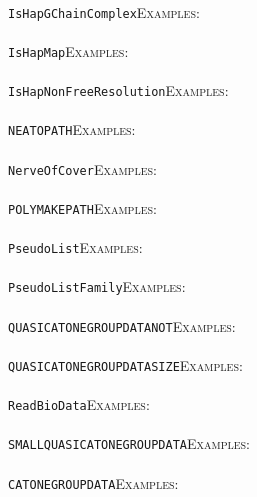 \documentclass[a4paper,11pt]{report}
\begin{document}
{{ \\
 \texttt{IsHapGChainComplex}{\nobreakspace}{\nobreakspace}{\nobreakspace}{\nobreakspace}\textsc{Examples:} \\
 \\
 \texttt{IsHapMap}{\nobreakspace}{\nobreakspace}{\nobreakspace}{\nobreakspace}\textsc{Examples:} \\
 \\
 \texttt{IsHapNonFreeResolution}{\nobreakspace}{\nobreakspace}{\nobreakspace}{\nobreakspace}\textsc{Examples:} \\
 \\
 \texttt{NEATO{\textunderscore}PATH}{\nobreakspace}{\nobreakspace}{\nobreakspace}{\nobreakspace}\textsc{Examples:} \\
 \\
 \texttt{NerveOfCover}{\nobreakspace}{\nobreakspace}{\nobreakspace}{\nobreakspace}\textsc{Examples:} \\
 \\
 \texttt{POLYMAKE{\textunderscore}PATH}{\nobreakspace}{\nobreakspace}{\nobreakspace}{\nobreakspace}\textsc{Examples:} \\
 \\
 \texttt{PseudoList}{\nobreakspace}{\nobreakspace}{\nobreakspace}{\nobreakspace}\textsc{Examples:} \\
 \\
 \texttt{PseudoListFamily}{\nobreakspace}{\nobreakspace}{\nobreakspace}{\nobreakspace}\textsc{Examples:} \\
 \\
 \texttt{QUASICATONEGROUP{\textunderscore}DATA{\textunderscore}NOT}{\nobreakspace}{\nobreakspace}{\nobreakspace}{\nobreakspace}\textsc{Examples:} \\
 \\
 \texttt{QUASICATONEGROUP{\textunderscore}DATA{\textunderscore}SIZE}{\nobreakspace}{\nobreakspace}{\nobreakspace}{\nobreakspace}\textsc{Examples:} \\
 \\
 \texttt{ReadBioData}{\nobreakspace}{\nobreakspace}{\nobreakspace}{\nobreakspace}\textsc{Examples:} \\
 \\
 \texttt{SMALLQUASICATONEGROUP{\textunderscore}DATA}{\nobreakspace}{\nobreakspace}{\nobreakspace}{\nobreakspace}\textsc{Examples:} \\
 \\
 \texttt{CATONEGROUP{\textunderscore}DATA}{\nobreakspace}{\nobreakspace}{\nobreakspace}{\nobreakspace}\textsc{Examples:} \\
}}
\end{document}
